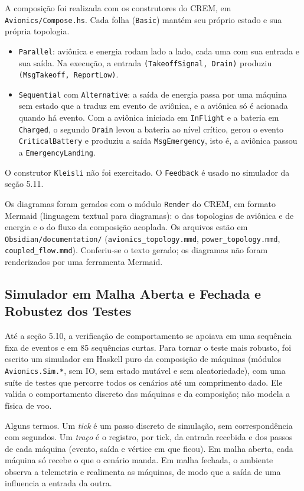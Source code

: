 \documentclass[12pt,a4paper]{article}
\begin{document}
A composição foi realizada com os construtores do CREM, em \texttt{Avionics/Compose.hs}. Cada folha (\texttt{Basic}) mantém seu próprio estado e sua própria topologia.

\begin{itemize}
\item \texttt{Parallel}: aviônica e energia rodam lado a lado, cada uma com sua entrada e sua saída. Na execução, a entrada \texttt{(TakeoffSignal, Drain)} produziu \texttt{(MsgTakeoff, ReportLow)}.
\item \texttt{Sequential} com \texttt{Alternative}: a saída de energia passa por uma máquina sem estado que a traduz em evento de aviônica, e a aviônica só é acionada quando há evento. Com a aviônica iniciada em \texttt{InFlight} e a bateria em \texttt{Charged}, o segundo \texttt{Drain} levou a bateria ao nível crítico, gerou o evento \texttt{CriticalBattery} e produziu a saída \texttt{MsgEmergency}, isto é, a aviônica passou a \texttt{EmergencyLanding}.
\end{itemize}

O construtor \texttt{Kleisli} não foi exercitado. O \texttt{Feedback} é usado no simulador da seção 5.11.

Os diagramas foram gerados com o módulo \texttt{Render} do CREM, em formato Mermaid (linguagem textual para diagramas): o das topologias de aviônica e de energia e o do fluxo da composição acoplada. Os arquivos estão em \texttt{Obsidian/documentation/} (\texttt{avionics\_topology.mmd}, \texttt{power\_topology.mmd}, \texttt{coupled\_flow.mmd}). Conferiu-se o texto gerado; os diagramas não foram renderizados por uma ferramenta Mermaid.

\subsection{Simulador em Malha Aberta e Fechada e Robustez dos Testes}

Até a seção 5.10, a verificação de comportamento se apoiava em uma sequência fixa de eventos e em 85 sequências curtas. Para tornar o teste mais robusto, foi escrito um simulador em Haskell puro da composição de máquinas (módulos \texttt{Avionics.Sim.*}, sem IO, sem estado mutável e sem aleatoriedade), com uma suíte de testes que percorre todos os cenários até um comprimento dado. Ele valida o comportamento discreto das máquinas e da composição; não modela a física de voo.

Alguns termos. Um \textit{tick} é um passo discreto de simulação, sem correspondência com segundos. Um \textit{traço} é o registro, por tick, da entrada recebida e dos passos de cada máquina (evento, saída e vértice em que ficou). Em malha aberta, cada máquina só recebe o que o cenário manda. Em malha fechada, o ambiente observa a telemetria e realimenta as máquinas, de modo que a saída de uma influencia a entrada da outra.
\end{document}
